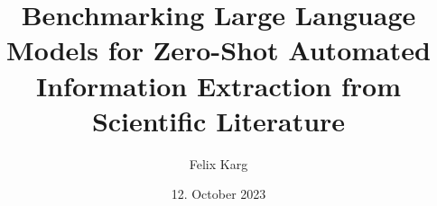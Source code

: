 \usepackage{graphicx}
\usepackage[export]{adjustbox}
\usepackage{multicol}
\usepackage{bibentry}
\usepackage{subcaption}
\usepackage{pdfpcnotes}

\usepackage{xcolor}
\usepackage{caption}
\usepackage[font={small,color=ocre},labelformat=empty]{caption}

\usepackage{csquotes}
\usepackage[acronym,toc,nopostdot]{glossaries}
\makeglossaries


\usepackage{tikz}


\def\signed #1{{\leavevmode\unskip\nobreak\hfil\penalty50\hskip1em
  \hbox{}\nobreak\hfill #1%
  \parfillskip=0pt \finalhyphendemerits=0 \endgraf}}

\newsavebox\mybox
\newenvironment{aquote}[1]
  {\savebox\mybox{#1}\begin{quote}\openautoquote\hspace*{-.7ex}}
  {\unskip\closeautoquote\vspace*{1mm}\signed{\usebox\mybox}\end{quote}}




\usepackage[outputdir={}]{minted}

\newcommand{\gray}[1]{
    \textcolor[gray]{0.65}{#1}
}





\title[Benchmarking Large Language Models for Information Extraction]{Benchmarking Large Language Models for Zero-Shot Automated Information Extraction from Scientific Literature}
\author[Felix Karg]{Felix Karg}

\date[12.\,10.\,2023]{12. October 2023}

